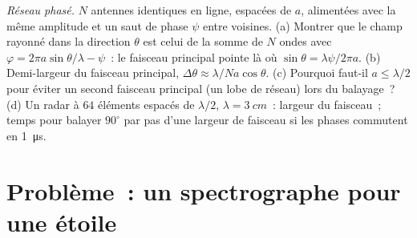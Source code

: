 \begin{exercise}[$\star\star\star$]\label{exo:b2:gratings:12}
\emph{Réseau phasé.} $N$ antennes identiques en ligne, espacées de $a$, alimentées
avec la même amplitude et un saut de phase $\psi$ entre voisines. (a)
Montrer que le champ rayonné dans la direction $\theta$ est celui de la
somme de $N$ ondes avec $\varphi = 2\pi a\sin\theta/\lambda - \psi$~: le faisceau principal pointe
là où $\sin\theta = \lambda\psi/2\pi a$. (b) Demi-largeur du faisceau principal, $\Delta\theta
\approx \lambda/Na\cos\theta$. (c) Pourquoi faut-il $a \le \lambda/2$ pour éviter un second faisceau principal
(un lobe de réseau) lors du balayage~? (d) Un radar à $64$ éléments espacés de
$\lambda/2$, $\lambda = \qty{3}{cm}$~: largeur du faisceau~; temps pour balayer $90^\circ$ par pas d'une
largeur de faisceau si les phases commutent en \qty{1}{\micro s}.
\end{exercise}

\section{Problème~: un spectrographe pour une étoile}

